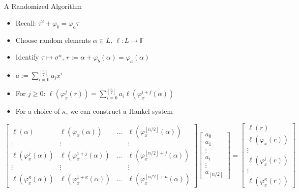 \documentclass{beamer}
\newcommand{\f}{\mathbb{F}}
\begin{document}
\begin{frame}{A Randomized Algorithm}

\begin{itemize}
    \item Recall: $\tau^2 + \varphi_b = \varphi_a \tau$
    \item Choose random elements $\alpha \in L$, $\ell : L \to \f$
    \item Identify $\tau \mapsto \sigma^n$, $r := \alpha + \varphi_b(\alpha) = \varphi_a(\alpha)$
    \item $a := \sum_{i=0}^{\left\lfloor \frac{n}{2} \right\rfloor}a_ix^i$
    \item For $j \geq 0$: $\ell(\varphi_x^j(r)) = \sum_{i = 0}^{\left\lfloor{\frac{n}{2}} \right\rfloor}a_i\ell(\varphi_x^{i+j}(\alpha))$
    \item For a choice of $\kappa$, we can construct a Hankel system
\end{itemize}
\[ \begin{bmatrix}\ell(\alpha) & \ell(\varphi_x(\alpha)) & \ldots & \ell(\varphi_x^{\left\lfloor n/2 \right\rfloor}(\alpha)) \\ \vdots & \vdots & & \vdots \\ 

\ell(\varphi_x^{j}(\alpha)) & \ell(\varphi_x^{1+j}(\alpha)) & \ldots & \ell(\varphi_x^{\left\lfloor n/2 \right\rfloor+j}(\alpha)) \\ \vdots & \vdots & & \vdots \\

\ell(\varphi_x^{\kappa}(\alpha)) & \ell(\varphi_x^{1 + \kappa }(\alpha)) & \ldots & \ell(\varphi_x^{\left\lfloor n/2 \right\rfloor + \kappa}(\alpha))

\end{bmatrix} \begin{bmatrix} a_0 \\ a_1 \\ \vdots \\ a_i \\ \vdots \\ a_{\left\lfloor n/2 \right\rfloor} \end{bmatrix} = \begin{bmatrix} \ell(r) \\ \ell(\varphi_x(r)) \\ \vdots \\ \ell(\varphi_x^j(r)) \\ \vdots  \\   \ell(\varphi_x^{\kappa}(r)) \end{bmatrix} \]
    
\end{frame}
\end{document}
